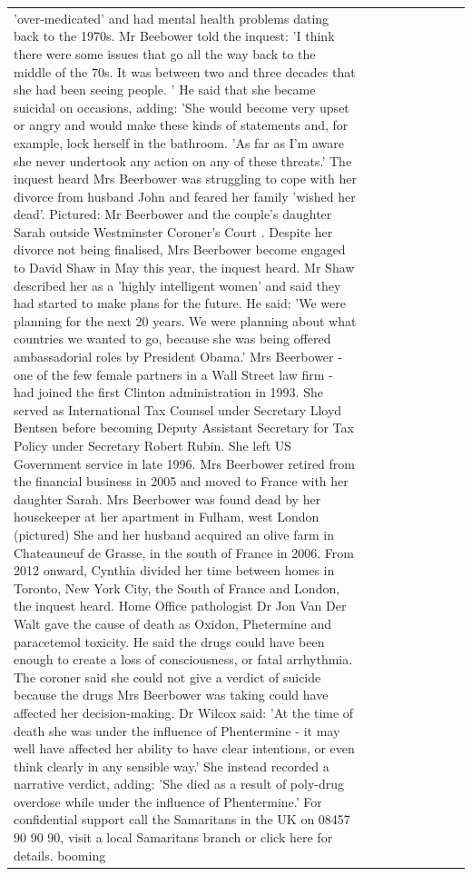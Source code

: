 \begin{table}[H]
\begin{tabular}{lllrlllll}
'over-medicated' and had mental health problems dating back to the 1970s. Mr Beebower told the inquest: 'I think there were some issues that go all the way back to the middle of the 70s. It was between two and three decades that she had been seeing people. ' He said that she became suicidal on occasions, adding: 'She would become very upset or angry and would make these kinds of statements and, for example, lock herself in the bathroom. 'As far as I'm aware she never undertook any action on any of these threats.' The inquest heard Mrs Beerbower was struggling to cope with her divorce from husband John and feared her family 'wished her dead'. Pictured: Mr Beerbower and the couple's daughter Sarah outside Westminster Coroner's Court . Despite her divorce not being finalised, Mrs Beerbower become engaged to David Shaw in May this year, the inquest heard. Mr Shaw described her as a 'highly intelligent women' and said they had started to make plans for the future. He said: 'We were planning for the next 20 years. We were planning about what countries we wanted to go, because she was being offered ambassadorial roles by President Obama.' Mrs Beerbower - one of the few female partners in a Wall Street law firm - had joined the first Clinton administration in 1993. She served as International Tax Counsel under Secretary Lloyd Bentsen before becoming Deputy Assistant Secretary for Tax Policy under Secretary Robert Rubin. She left US Government service in late 1996. Mrs Beerbower retired from the financial business in 2005 and moved to France with her daughter Sarah. Mrs Beerbower was found dead by her housekeeper at her apartment in Fulham, west London (pictured) She and her husband acquired an olive farm in Chateauneuf de Grasse, in the south of France in 2006. From 2012 onward, Cynthia divided her time between homes in Toronto, New York City, the South of France and London, the inquest heard. Home Office pathologist Dr Jon Van Der Walt gave the cause of death as Oxidon, Phetermine and paracetemol toxicity. He said the drugs could have been enough to create a loss of consciousness, or fatal arrhythmia. The coroner said she could not give a verdict of suicide because the drugs Mrs Beerbower was taking could have affected her decision-making. Dr Wilcox said: 'At the time of death she was under the influence of Phentermine - it may well have affected her ability to have clear intentions, or even think clearly in any sensible way.' She instead recorded a narrative verdict, adding: 'She died as a result of poly-drug overdose while under the influence of Phentermine.' For confidential support call the Samaritans in the UK on 08457 90 90 90, visit a local Samaritans branch or click here for details. booming \\

\end{tabular}
\end{table}
